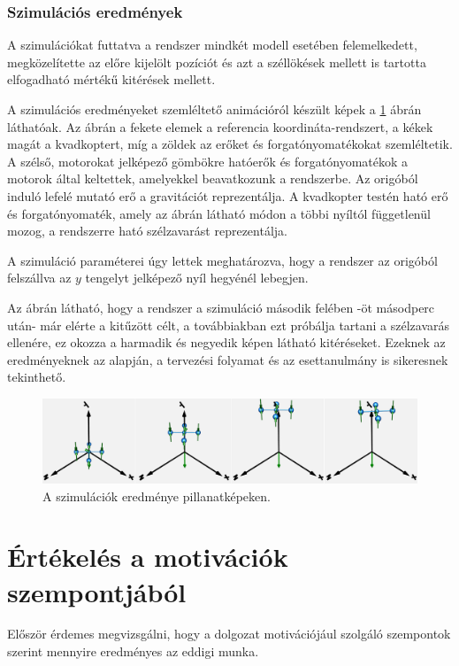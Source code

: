         \subsubsection{Szimulációs eredmények}
        A szimulációkat futtatva a rendszer mindkét modell esetében felemelkedett, megközelítette az előre kijelölt pozíciót és azt a széllökések mellett is tartotta elfogadható mértékű kitérések mellett.
        
        A szimulációs eredményeket szemléltető animációról készült képek a \ref{fig:SimRes} ábrán láthatóak.
        Az ábrán a fekete elemek a referencia koordináta-rendszert, a kékek magát a kvadkoptert, míg a zöldek az erőket és forgatónyomatékokat szemléltetik.
        A szélső, motorokat jelképező gömbökre hatóerők és forgatónyomatékok a motorok által keltettek, amelyekkel beavatkozunk a rendszerbe. Az origóból induló lefelé mutató erő a gravitációt reprezentálja.
        A kvadkopter testén ható erő és forgatónyomaték, amely az ábrán látható módon a többi nyíltól függetlenül mozog, a rendszerre ható szélzavarást reprezentálja.

        A szimuláció paraméterei úgy lettek meghatározva, hogy a rendszer az origóból felszállva az $y$ tengelyt jelképező nyíl hegyénél lebegjen.
        
        Az ábrán látható, hogy a rendszer a szimuláció második felében -öt másodperc után- már elérte a kitűzött célt, a továbbiakban ezt próbálja tartani a szélzavarás ellenére, ez okozza a harmadik és negyedik képen látható kitéréseket.
        Ezeknek az eredményeknek az alapján, a tervezési folyamat és az esettanulmány is sikeresnek tekinthető.

        \begin{figure}[!ht]
            \centering
            \includegraphics[width=150mm, keepaspectratio]{figures/SimRes.png}
            \caption{A szimulációk eredménye pillanatképeken.}
            \label{fig:SimRes}
        \end{figure}

    \section{Értékelés a motivációk szempontjából}
    Először érdemes megvizsgálni, hogy a dolgozat motivációjául szolgáló szempontok szerint mennyire eredményes az eddigi munka.

